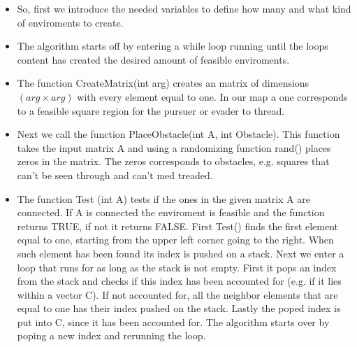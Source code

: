 \begin{itemize}
\item So, first we introduce the needed variables to define how many and what kind of enviroments to create. 
\item The algorithm starts off by entering a while loop running until the loops content has created the desired amount of feasible enviroments. 
\item The function CreateMatrix(int arg) creates an matrix of dimensions $(arg \times arg)$ with every element equal to one. In our map a one corresponds to a feasible square region for the pursuer or evader to thread. 
\item Next we call the function PlaceObstacle(int A, int Obstacle). This function takes the input matrix A and using a randomizing function rand() places zeros in the matrix. The zeros corresponds to obstacles, e.g. squares that can't be seen through and can't med treaded.
\item The function Test (int A) tests if the ones in the given matrix A are connected. If A is connected the enviroment is feasible and the function returns TRUE, if not it returns FALSE. First Test() finds the first element equal to one, starting from the upper left corner going to the right. When such element has been found its index is pushed on a stack. Next we enter a loop that runs for as long as the stack is not empty. First it pops an index from the stack and checks if this index has been accounted for (e.g. if it lies within a vector C). If not accounted for, all the neighbor elements that are equal to one has their index pushed on the stack. Lastly the poped index is put into C, since it has been accounted for. The algorithm starts over by poping a new index and rerunning the loop. 
\end{itemize}

